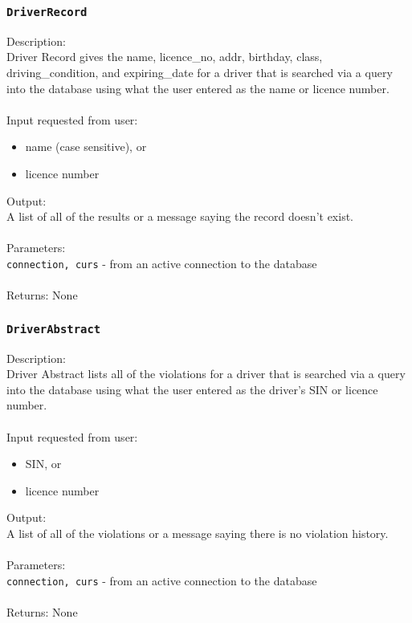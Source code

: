 \documentclass[12pt]{article}
\begin{document}
\subsubsection{\texttt{DriverRecord}}
Description:\\
\indent Driver Record gives the name, licence\_no, addr, birthday, class,
    driving\_condition, and expiring\_date for a driver that is searched via 
    a query into the database using what the user entered as the name or 
    licence number. \\\\
Input requested from user:
\begin{itemize}
\item name (case sensitive), or
\item licence number
\end{itemize}
Output:\\
\indent A list of all of the results or a message saying the record doesn't exist.\\\\
Parameters:\\
\indent\texttt{connection, curs} - from an active connection to the database\\\\
Returns: None

\subsubsection{\texttt{DriverAbstract}}
Description:\\
\indent Driver Abstract lists all of the violations for a driver that 
    is searched via a query into the database using what the user 
    entered as the driver's SIN or licence number. \\\\
Input requested from user:
\begin{itemize}
\item SIN, or
\item licence number
\end{itemize}
Output:\\
\indent A list of all of the violations or a message saying there 
            is no violation history.\\\\
Parameters:\\
\indent\texttt{connection, curs} - from an active connection to the database\\\\
Returns: None
\end{document}
